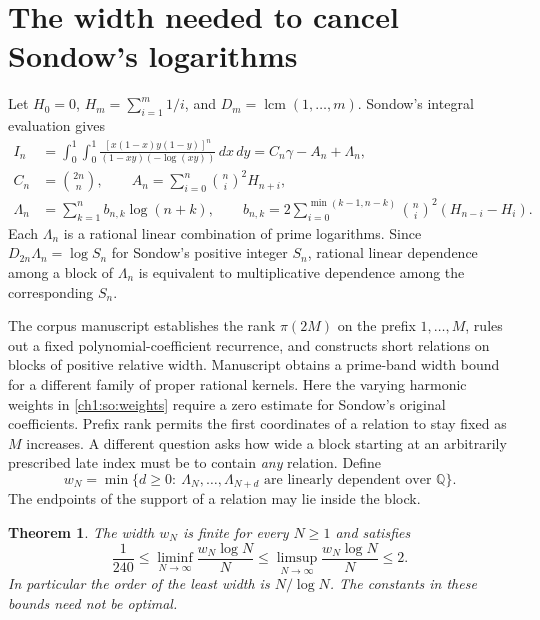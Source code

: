 \documentclass[11pt,a4paper,oneside,openany]{report}
\newtheorem{theorem}{Theorem}[section]
\theoremstyle{remark}\newtheorem{remark}[theorem]{Remark}
\numberwithin{equation}{section}
\begin{document}
\section{The width needed to cancel Sondow's logarithms}
\label{ch1:so:section}

Let $H_0=0$, $H_m=\sum_{i=1}^m1/i$, and
$D_m=\operatorname{lcm}(1,\ldots,m)$. Sondow's integral evaluation
\cite{sondow} gives
\begin{align}
 I_n&=\int_0^1\!\int_0^1
 \frac{[x(1-x)y(1-y)]^n}{(1-xy)(-\log(xy))}\,dx\,dy
 =C_n\gamma-A_n+\Lambda_n, \label{ch1:so:identity}\\
 C_n&=\binom{2n}{n},\qquad A_n=\sum_{i=0}^n\binom ni^2 H_{n+i},\nonumber\\
 \Lambda_n&=\sum_{k=1}^n b_{n,k}\log(n+k),\qquad
 b_{n,k}=2\sum_{i=0}^{\min(k-1,n-k)}
          \binom ni^2(H_{n-i}-H_i).\label{ch1:so:weights}
\end{align}
Each $\Lambda_n$ is a rational linear combination of prime logarithms.
Since $D_{2n}\Lambda_n=\log S_n$ for Sondow's positive integer $S_n$, rational
linear dependence among a block of $\Lambda_n$ is equivalent to multiplicative
dependence among the corresponding $S_n$.

The corpus manuscript \cite{vm19} establishes the rank $\pi(2M)$ on
the prefix $1,\ldots,M$, rules out a fixed polynomial-coefficient
recurrence, and constructs short relations on blocks of positive
relative width. Manuscript \cite{vm105} obtains a prime-band width bound for a different family of proper rational kernels. Here the varying harmonic weights in \eqref{ch1:so:weights} require a zero estimate for Sondow's original coefficients. Prefix rank permits the first coordinates of a relation
to stay fixed as $M$ increases. A different question asks how wide a block
starting at an arbitrarily prescribed late index must be to contain
\emph{any} relation. Define
\[
 w_N=\min\{d\geq 0:\ \Lambda_N,\ldots,\Lambda_{N+d}
                   \text{ are linearly dependent over }\mathbb Q\}.
\]
The endpoints of the support of a relation may lie inside the block.

\begin{theorem}\label{ch1:so:width}
The width $w_N$ is finite for every $N\geq1$ and satisfies
\[
 \frac1{240}\leq\liminf_{N\to\infty}\frac{w_N\log N}{N}
 \leq\limsup_{N\to\infty}\frac{w_N\log N}{N}\leq 2 .
\]
In particular the order of the least width is $N/\log N$. The constants
in these bounds need not be optimal.
\end{theorem}
\end{document}
